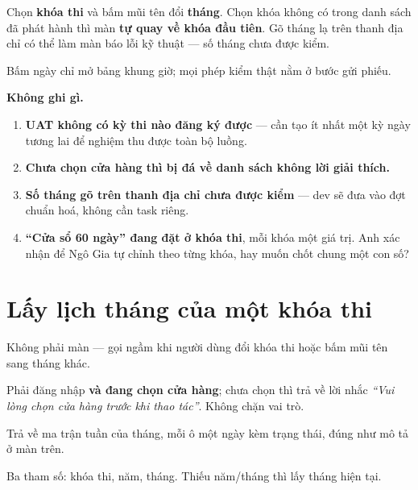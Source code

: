 Chọn \textbf{khóa thi} và bấm mũi tên đổi \textbf{tháng}. Chọn khóa không có trong danh sách
đã phát hành thì màn \textbf{tự quay về khóa đầu tiên}. Gõ tháng lạ trên thanh địa chỉ có thể
làm màn báo lỗi kỹ thuật --- số tháng chưa được kiểm.


Bấm ngày chỉ mở bảng khung giờ; mọi phép kiểm thật nằm ở bước gửi phiếu.

\mghi

\textbf{Không ghi gì.}

\mhoi

\begin{ask}
\begin{enumerate}[leftmargin=*]
  \item \textbf{UAT không có kỳ thi nào đăng ký được} --- cần tạo ít nhất một kỳ ngày tương lai
        để nghiệm thu được toàn bộ luồng.
  \item \textbf{Chưa chọn cửa hàng thì bị đá về danh sách không lời giải thích.}
  \item \textbf{Số tháng gõ trên thanh địa chỉ chưa được kiểm} --- dev sẽ đưa vào đợt chuẩn hoá,
        không cần task riêng.
  \item \textbf{``Cửa sổ 60 ngày'' đang đặt ở khóa thi}, mỗi khóa một giá trị. Anh xác nhận để
        Ngô Gia tự chỉnh theo từng khóa, hay muốn chốt chung một con số?
\end{enumerate}
\end{ask}

\section{Lấy lịch tháng của một khóa thi}
\medskip

\mvao

Không phải màn --- gọi ngầm khi người dùng đổi khóa thi hoặc bấm mũi tên sang tháng khác.

\mai

Phải đăng nhập \textbf{và đang chọn cửa hàng}; chưa chọn thì trả về lời nhắc \emph{``Vui lòng
chọn cửa hàng trước khi thao tác''}. Không chặn vai trò.

\mhien

Trả về ma trận tuần của tháng, mỗi ô một ngày kèm trạng thái, đúng như mô tả ở màn trên.

\mloc

Ba tham số: khóa thi, năm, tháng. Thiếu năm/tháng thì lấy tháng hiện tại.

